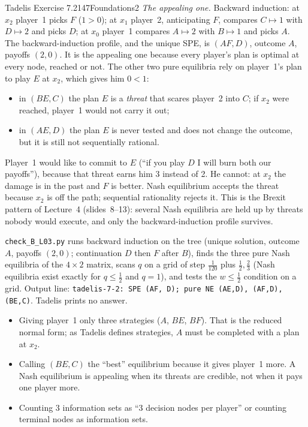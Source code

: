 \begin{exsol}{Tadelis Exercise 7.2}{147}{Foundations}{2}
\emph{The appealing one.} Backward induction: at $x_2$ player~1 picks $F$ ($1 > 0$); at $x_1$
player~2, anticipating $F$, compares $C \mapsto 1$ with $D \mapsto 2$ and picks $D$; at $x_0$
player~1 compares $A \mapsto 2$ with $B \mapsto 1$ and picks $A$. The backward-induction profile,
and the unique SPE, is $(AF, D)$, outcome $A$, payoffs $(2, 0)$. It is the appealing one because
every player's plan is optimal at every node, reached or not. The other two pure equilibria rely
on player~1's plan to play $E$ at $x_2$, which gives him $0 < 1$:
\begin{itemize}
  \item in $(BE, C)$ the plan $E$ is a \emph{threat} that scares player~2 into $C$; if $x_2$ were
  reached, player~1 would not carry it out;
  \item in $(AE, D)$ the plan $E$ is never tested and does not change the outcome, but it is still
  not sequentially rational.
\end{itemize}

\interp Player~1 would like to commit to $E$ (``if you play $D$ I will burn both our payoffs''),
because that threat earns him 3 instead of 2. He cannot: at $x_2$ the damage is in the past and
$F$ is better. Nash equilibrium accepts the threat because $x_2$ is off the path; sequential
rationality rejects it. This is the Brexit pattern of Lecture~4 (slides~8--13): several Nash
equilibria are held up by threats nobody would execute, and only the backward-induction profile
survives.

\verify \texttt{check\_B\_L03.py} runs backward induction on the tree (unique solution, outcome
$A$, payoffs $(2,0)$; continuation $D$ then $F$ after $B$), finds the three pure Nash equilibria of
the $4\times2$ matrix, scans $q$ on a grid of step $\frac1{120}$ plus $\frac12, \frac23$ (Nash
equilibria exist exactly for $q \le \frac12$ and $q = 1$), and tests the $w \le \frac12$
condition on a grid. Output line: \texttt{tadelis-7-2: SPE (AF, D); pure NE (AE,D), (AF,D),
(BE,C)}. Tadelis prints no answer.

\mistakes
\begin{itemize}
  \item Giving player~1 only three strategies ($A$, $BE$, $BF$). That is the reduced normal form;
  as Tadelis defines strategies, $A$ must be completed with a plan at $x_2$.
  \item Calling $(BE, C)$ the ``best'' equilibrium because it gives player~1 more. A Nash
  equilibrium is appealing when its threats are credible, not when it pays one player more.
  \item Counting 3 information sets as ``3 decision nodes per player'' or counting terminal nodes
  as information sets.
\end{itemize}


\end{exsol}
